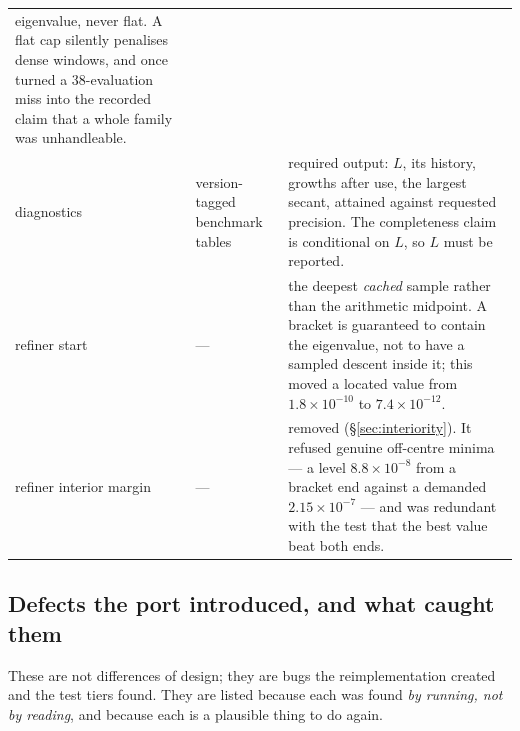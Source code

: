 \documentclass[11pt]{article}
\theoremstyle{definition}
\theoremstyle{remark}
\begin{document}
\begin{longtable}{P{0.17\textwidth}P{0.29\textwidth}P{0.42\textwidth}}
{eigenvalue}, never flat. A flat cap silently penalises dense windows, and once turned a
38-evaluation miss into the recorded claim that a whole family was unhandleable.\\[2pt]
diagnostics & version-tagged benchmark tables & required output: $L$, its history, growths
after use, the largest secant, attained against requested precision. The completeness claim is
conditional on $L$, so $L$ must be reported.\\[2pt]
refiner start & --- & the deepest \emph{cached} sample rather than the arithmetic midpoint. A
bracket is guaranteed to contain the eigenvalue, not to have a sampled descent inside it; this
moved a located value from $1.8\times10^{-10}$ to $7.4\times10^{-12}$.\\[2pt]
refiner interior margin & --- & removed (\S\ref{sec:interiority}). It refused genuine
off-centre minima --- a level $8.8\times10^{-8}$ from a bracket end against a demanded
$2.15\times10^{-7}$ --- and was redundant with the test that the best value beat both ends.\\
\bottomrule
\end{longtable}


\subsection{Defects the port introduced, and what caught them}

These are not differences of design; they are bugs the reimplementation created and the test
tiers found. They are listed because each was found \emph{by running, not by reading}, and
because each is a plausible thing to do again.
\end{document}
